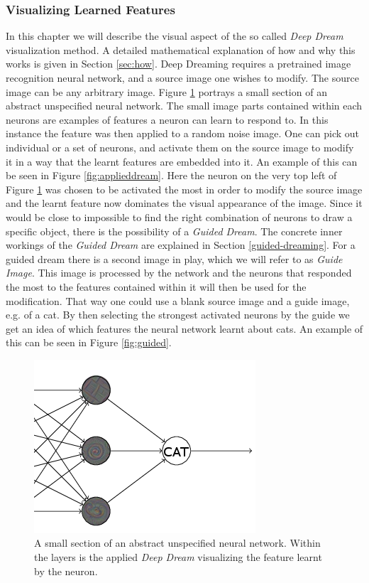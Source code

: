 \subsubsection{Visualizing Learned Features}
In this chapter we will describe the visual aspect of the so called \textit{Deep Dream} visualization method.
A detailed mathematical explanation of how and why this works is given in Section \ref{sec:how}.
Deep Dreaming requires a pretrained image recognition neural network, and a source image one wishes to modify. The source image can be any arbitrary image.
Figure \ref{fig:neuronreact} portrays a small section of an abstract unspecified neural network.
The small image parts contained within each neurons are examples of features a neuron can learn to respond to. In this instance the feature was then applied to a random noise image.
One can pick out individual or a set of neurons,
and activate them on the source image to modify it in a way that the learnt features are embedded into it.
An example of this can be seen in Figure \ref{fig:applieddream}.
Here the neuron on the very top left of Figure \ref{fig:neuronreact} was chosen to be activated the most in order to modify the source image and the learnt feature now dominates the visual appearance of the image.
Since it would be close to impossible to find the right combination of neurons to draw a specific object, there is the possibility of a \textit{Guided Dream}.
The concrete inner workings of the \textit{Guided Dream} are explained in Section \ref{guided-dreaming}.
For a guided dream there is a second image in play, which we will refer to as \textit{Guide Image}.
This image is processed by the network and the neurons that responded the most to the features contained within it will then be used for the modification.
That way one could use a blank source image and a guide image, e.g. of a cat. By then selecting the strongest activated neurons by the guide we get an idea of which features the neural network learnt about cats.
An example of this can be seen in Figure \ref{fig:guided}.

\begin{figure}[H]
	\centering
	\includegraphics[width=0.5\linewidth]{img/neurons-reaction.png}
	\caption{A small section of an abstract unspecified neural network. Within the layers is the applied \textit{Deep Dream} visualizing the feature learnt by the neuron\cite{nielsen2015neural}.}
	\label{fig:neuronreact}
\end{figure}

